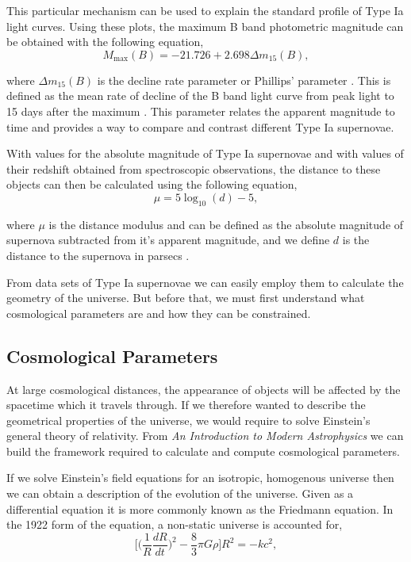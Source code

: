 \documentclass[twocolumn]{revtex4}
\begin{document}
This particular mechanism can be used to explain the standard profile of Type Ia light curves. Using these plots, the maximum B band photometric magnitude can be obtained with the following equation,
\begin{equation}
M_{\max}(B)=-21.726+2.698\Delta m_{15}(B),
\end{equation}

where $\Delta m_{15}(B)$ is the decline rate parameter or Phillips' parameter \cite{high_en_astro}. This is defined as the mean rate of decline of the B band light curve from peak light to 15 days after the maximum \cite{abs_phil}. This parameter relates the apparent magnitude to time and provides a way to compare and contrast different Type Ia supernovae. 

With values for the absolute magnitude of Type Ia supernovae and with values of their redshift obtained from spectroscopic observations, the distance to these objects can then be calculated using the following equation, 
\begin{equation}
\mu = 5 \log_{10}(d) - 5,
\end{equation}

where $\mu$ is the distance modulus and can be defined as the absolute magnitude of supernova subtracted from it's apparent magnitude, and we define $d$ is the distance to the supernova in parsecs \cite{mod_ast}. 

From data sets of Type Ia supernovae we can easily employ them to calculate the geometry of the universe. But before that, we must first understand what cosmological parameters are and how they can be constrained.

\vspace{-3ex}
\subsection{Cosmological Parameters}
\label{sec:cosmo_parameters}
\vspace{-2ex}
At large cosmological distances, the appearance of objects will be affected by the spacetime which it travels through. If we therefore wanted to describe the geometrical properties of the universe, we would require to solve Einstein's general theory of relativity. From \textit{An Introduction to Modern Astrophysics} \cite{mod_ast} we can build the framework required to calculate and compute cosmological parameters. 

If we solve Einstein's field equations for an isotropic, homogenous universe then we can obtain a description of the evolution of the universe. Given as a differential equation it is more commonly known as the Friedmann equation. In the 1922 form of the equation, a non-static universe is accounted for,
\begin{equation}
\Big[ \Big( \frac{1}{R} \frac{dR}{dt} \Big)^2 - \frac{8}{3} \pi G \rho \Big] R^2 = -k c^2,
\label{eqn:1922_friedmann}
\end{equation}
\end{document}
